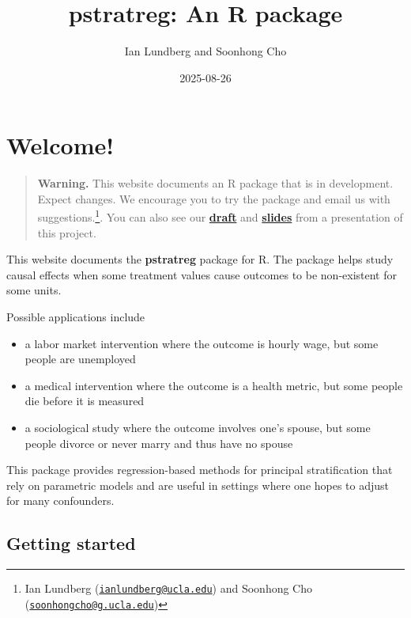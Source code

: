 \documentclass[
]{book}
\title{pstratreg: An R package}
\author{Ian Lundberg and Soonhong Cho}
\date{2025-08-26}
\providecommand{\tightlist}{%
  \setlength{\itemsep}{0pt}\setlength{\parskip}{0pt}}
\begin{document}
\maketitle

{
\setcounter{tocdepth}{1}
\tableofcontents
}
\chapter*{Welcome!}\label{welcome}

\begin{quote}
\textbf{Warning.} This website documents an R package that is in development. Expect changes. We encourage you to try the package and email us with suggestions.\footnote{Ian Lundberg (\href{mailto:ianlundberg@ucla.edu}{\nolinkurl{ianlundberg@ucla.edu}}) and Soonhong Cho (\href{mailto:soonhongcho@g.ucla.edu}{\nolinkurl{soonhongcho@g.ucla.edu}})}. You can also see our \href{https://arxiv.org/abs/2508.14770}{\textbf{draft}} and \href{assets/nonexistentoutcomes_utokyo.pdf}{\textbf{slides}} from a presentation of this project.
\end{quote}

This website documents the \textbf{pstratreg} package for R. The package helps study causal effects when some treatment values cause outcomes to be non-existent for some units.

Possible applications include

\begin{itemize}
\tightlist
\item
  a labor market intervention where the outcome is hourly wage, but some people are unemployed
\item
  a medical intervention where the outcome is a health metric, but some people die before it is measured
\item
  a sociological study where the outcome involves one's spouse, but some people divorce or never marry and thus have no spouse
\end{itemize}

This package provides regression-based methods for principal stratification that rely on parametric models and are useful in settings where one hopes to adjust for many confounders.

\section*{Getting started}\label{getting-started}
\end{document}
